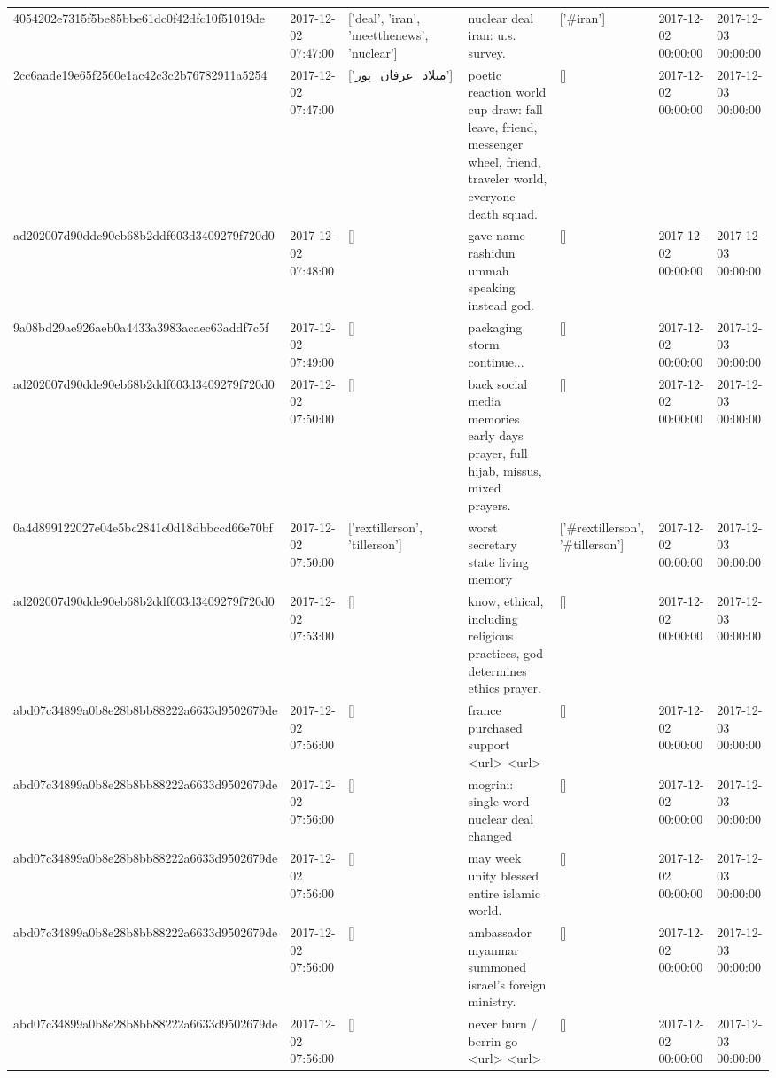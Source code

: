 \begin{tabular}{lllllll}
4054202e7315f5be85bbe61dc0f42dfc10f51019de & 2017-12-02 07:47:00 & ['deal', 'iran', 'meetthenews', 'nuclear'] & nuclear deal iran: u.s. survey. & ['#iran'] & 2017-12-02 00:00:00 & 2017-12-03 00:00:00 \\
2cc6aade19e65f2560e1ac42c3c2b76782911a5254 & 2017-12-02 07:47:00 & ['میلاد_عرفان_پور'] & poetic reaction world cup draw: fall leave, friend, messenger wheel, friend, traveler world, everyone death squad. & [] & 2017-12-02 00:00:00 & 2017-12-03 00:00:00 \\
ad202007d90dde90eb68b2ddf603d3409279f720d0 & 2017-12-02 07:48:00 & [] & gave name rashidun ummah speaking instead god. & [] & 2017-12-02 00:00:00 & 2017-12-03 00:00:00 \\
9a08bd29ae926aeb0a4433a3983acaec63addf7c5f & 2017-12-02 07:49:00 & [] & packaging storm continue... & [] & 2017-12-02 00:00:00 & 2017-12-03 00:00:00 \\
ad202007d90dde90eb68b2ddf603d3409279f720d0 & 2017-12-02 07:50:00 & [] & back social media memories early days prayer, full hijab, missus, mixed prayers. & [] & 2017-12-02 00:00:00 & 2017-12-03 00:00:00 \\
0a4d899122027e04e5bc2841c0d18dbbccd66e70bf & 2017-12-02 07:50:00 & ['rextillerson', 'tillerson'] & worst secretary state living memory & ['#rextillerson', '#tillerson'] & 2017-12-02 00:00:00 & 2017-12-03 00:00:00 \\
ad202007d90dde90eb68b2ddf603d3409279f720d0 & 2017-12-02 07:53:00 & [] & know, ethical, including religious practices, god determines ethics prayer. & [] & 2017-12-02 00:00:00 & 2017-12-03 00:00:00 \\
abd07c34899a0b8e28b8bb88222a6633d9502679de & 2017-12-02 07:56:00 & [] & france purchased support <url> <url> & [] & 2017-12-02 00:00:00 & 2017-12-03 00:00:00 \\
abd07c34899a0b8e28b8bb88222a6633d9502679de & 2017-12-02 07:56:00 & [] & mogrini: single word nuclear deal changed & [] & 2017-12-02 00:00:00 & 2017-12-03 00:00:00 \\
abd07c34899a0b8e28b8bb88222a6633d9502679de & 2017-12-02 07:56:00 & [] & may week unity blessed entire islamic world. & [] & 2017-12-02 00:00:00 & 2017-12-03 00:00:00 \\
abd07c34899a0b8e28b8bb88222a6633d9502679de & 2017-12-02 07:56:00 & [] & ambassador myanmar summoned israel's foreign ministry. & [] & 2017-12-02 00:00:00 & 2017-12-03 00:00:00 \\
abd07c34899a0b8e28b8bb88222a6633d9502679de & 2017-12-02 07:56:00 & [] & never burn / berrin go <url> <url> & [] & 2017-12-02 00:00:00 & 2017-12-03 00:00:00 \\

\end{tabular}
